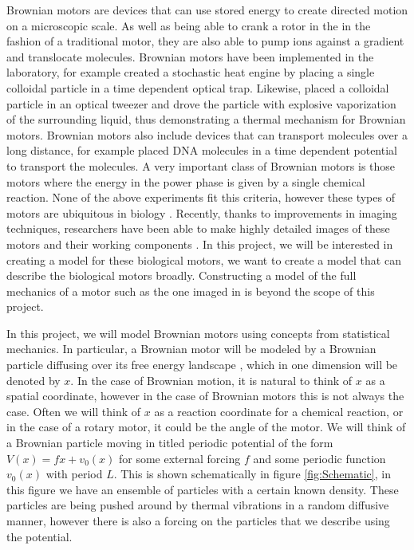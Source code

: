\documentclass[11pt]{article} %
\begin{document}
Brownian motors are devices that can use stored energy to create directed motion on a microscopic scale. As well as being able to crank a rotor in the in the fashion of a traditional motor, they are also able to pump ions against a gradient and translocate molecules. Brownian motors have been implemented in the laboratory, for example \cite{BlickleBechinger2011} created a stochastic heat engine by placing a single colloidal particle in a time dependent optical trap. Likewise, \cite{Pedro2014} placed a colloidal particle in an optical tweezer and drove the particle with explosive vaporization of the surrounding liquid, thus demonstrating a thermal mechanism for Brownian motors. Brownian motors also include devices that can transport molecules over a long distance, for example \cite{JoelBader1999} placed DNA molecules in a time dependent potential to transport the molecules. A very important class of Brownian motors is those motors where the energy in the power phase is given by a single chemical reaction. None of the above experiments fit this criteria, however these types of motors are ubiquitous in biology \cite{PhillipsQuakeMay2006, Magnasco1994}. Recently, thanks to improvements in imaging techniques, researchers have been able to make highly detailed images of these motors and their working components \cite{YiWeiChang2016}. In this project, we will be interested in creating a model for these biological motors, we want to create a model that can describe the biological motors broadly. Constructing a model of the full mechanics of a motor such as the one imaged in \cite{YiWeiChang2016} is beyond the scope of this project.

In this project, we will model Brownian motors using concepts from statistical mechanics. In particular, a Brownian motor will be modeled by a Brownian particle diffusing over its free energy landscape \cite{Reimann2001}, which in one dimension will be denoted by $x$. In the case of Brownian motion, it is natural to think of $x$ as a spatial coordinate, however in the case of Brownian motors this is not always the case. Often we will think of $x$ as a reaction coordinate for a chemical reaction, or in the case of a rotary motor, it could be the angle of the motor. We will think of a Brownian particle moving in titled periodic potential of the form $V(x) = f x + v_0(x)$ for some external forcing $f$ and some periodic function $v_0(x)$ with period $L$. This is shown schematically in figure \ref{fig:Schematic}, in this figure we have an ensemble of  particles with a certain known density. These particles are being pushed around by thermal vibrations in a random diffusive manner, however there is also a forcing on the particles that we describe using the potential.
\end{document}
